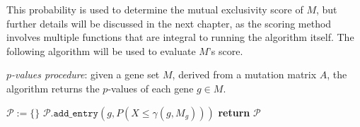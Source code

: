 This probability is used to determine the mutual exclusivity score of $M$, but further details will be discussed in the next chapter, as the scoring method involves multiple functions that are integral to running the algorithm itself. The following algorithm will be used to evaluate $M$'s score.

\begin{algorithm}[H]
    \caption{
        \textit{$p$-values procedure}: given a gene set $M$, derived from a mutation matrix $A$, the algorithm returns the $p$-values of each gene $g \in M$.
    }

        \label{p-values_procedure}
    \begin{algorithmic}[1]
            \State $\mathcal P := \texttt{\{\}}$
                \State $\mathcal P.\texttt{add\_entry}(g, P(X \le \gamma(g, M_g)))$ 
            \EndFor
            \State \textbf{return} $\mathcal P$
        \EndFunction
    \end{algorithmic}
\end{algorithm}

%
%

